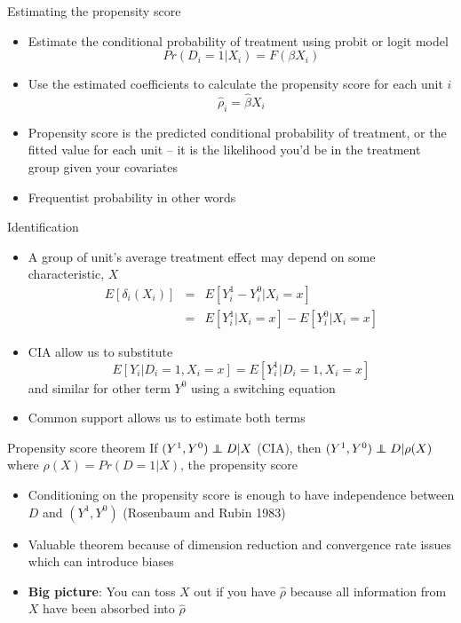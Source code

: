 \documentclass{beamer}
\newcommand\independent{\protect\mathpalette{\protect\independenT}{\perp}}
\def\independenT#1#2{\mathrel{\rlap{$#1#2$}\mkern2mu{#1#2}}}
\begin{document}
\begin{frame}{Estimating the propensity score}

		\begin{itemize}
		\item Estimate the conditional probability of treatment using probit or logit model$$Pr(D_i=1|X_i) = F(\beta X_i)$$
		\item Use the estimated coefficients to calculate the propensity score for each unit $i$$$\widehat{\rho}_i = \widehat{\beta} X_i$$
		\item Propensity score is the predicted conditional probability of treatment, or the fitted value for each unit -- it is the likelihood you'd be in the treatment group given your covariates
		\item Frequentist probability in other words
		\end{itemize}
\end{frame}

\begin{frame}{Identification}
	
	\begin{itemize}
	\item A group of unit's average treatment effect may depend on some characteristic, $X$
		\begin{eqnarray*}
		E[\delta_i(X_i) ]&=& E[Y^1_i - Y^0_i | X_i=x] \\
		&=&E[Y^1_i | X_i=x] - E[Y^0_i | X_i=x]
		\end{eqnarray*}
	\item CIA allow us to substitute $$E[Y_i | D_i =1, X_i=x]=E[Y_i^1 | D_i=1, X_i=x]$$ and similar for other term $Y^0$ using a switching equation
	\item Common support allows us to estimate both terms
	\end{itemize}
\end{frame}		


\begin{frame}[plain]
	
	\begin{block}{Propensity score theorem}
	If $(Y^1,Y^0)\independent{D}|X$ (CIA), then $(Y^1,Y^0)\independent{D} | \rho(X)$ where $\rho(X)=Pr(D=1|X)$, the propensity score
	\end{block}
	
	\begin{itemize}
	\item Conditioning on the propensity score is enough to have independence between $D$ and $(Y^1,Y^0)$ (Rosenbaum and Rubin 1983)\\
	 \item Valuable theorem because of dimension reduction and convergence rate issues which can introduce biases
	\item \textbf{Big picture}: You can toss $X$ out if you have $\widehat{\rho}$ because all information from $X$ have been absorbed into $\widehat{\rho}$
	\end{itemize}
\end{frame}
\end{document}

